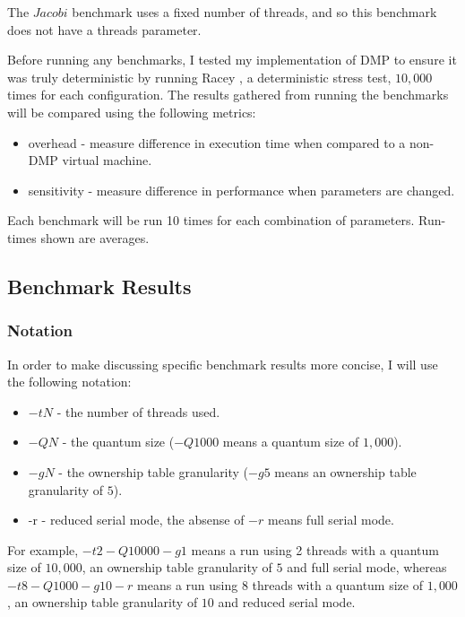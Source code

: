The $Jacobi$ benchmark uses a fixed number of threads, and so this
benchmark does not have a threads parameter.

Before running any benchmarks, I tested my implementation of DMP to
ensure it was truly deterministic by running Racey \cite{racey}, a
deterministic stress test, $10,000$ times for each configuration.  The
results gathered from running the benchmarks will be compared using
the following metrics:

\begin{itemize}
\item overhead - measure difference in execution time when compared to
  a non-DMP virtual machine.

\item sensitivity - measure difference in performance when parameters
  are changed.
\end{itemize}

Each benchmark will be run 10 times for each combination of
parameters.  Run-times shown are averages.

\subsection{Benchmark Results}

\subsubsection{Notation}

In order to make discussing specific benchmark results more concise, I
will use the following notation:

\begin{itemize}
\item $-tN$ - the number of threads used.

\item $-QN$ - the quantum size ($-Q1000$ means a quantum size of
  $1,000$).

\item $-gN$ - the ownership table granularity ($-g5$ means an
  ownership table granularity of $5$).

\item -r - reduced serial mode, the absense of $-r$ means full serial
  mode.
\end{itemize}

For example, $-t2 -Q10000 -g1$ means a run using 2 threads with a
quantum size of $10,000$, an ownership table granularity of $5$ and
full serial mode, whereas $-t8 -Q1000 -g10 -r$ means a run using 8
threads with a quantum size of $1,000$, an ownership table granularity
of $10$ and reduced serial mode.


